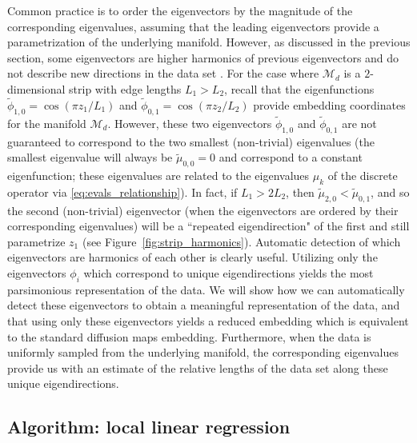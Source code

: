\documentclass[3p]{elsarticle}
\begin{document}
Common practice is to order the eigenvectors by the magnitude of the corresponding eigenvalues,
assuming that the leading eigenvectors provide a parametrization of the underlying manifold.
%
However, as discussed in the previous section, some eigenvectors are higher harmonics of
previous eigenvectors and do not describe new directions in the data set \cite{gerber2007robust}.
%
For the case where $\mathcal{M}_d$ is a $2$-dimensional strip with edge lengths $L_1  > L_2$, recall
that the eigenfunctions $\tilde{\phi}_{1,0} = \cos \left(  {\pi z_1}/{L_1} \right)$ and
$\tilde{\phi}_{0,1} = \cos \left(  {\pi z_2}/{L_2} \right)$ provide embedding coordinates for the manifold $\mathcal{M}_d$.
%
However, these two eigenvectors $\tilde{\phi}_{1, 0}$ and $\tilde{\phi}_{0, 1}$ are not guaranteed to
correspond to the two smallest (non-trivial) eigenvalues (the smallest eigenvalue will always be $\tilde{\mu}_{0,0} = 0$ and
correspond to a constant eigenfunction; these eigenvalues are related to the eigenvalues $\mu_k$ of the discrete
operator via \eqref{eq:evals_relationship}).
%
In fact, if $L_1 > 2 L_2$, then $\tilde{\mu}_{2, 0} < \tilde{\mu}_{0, 1}$, and so the
second (non-trivial) eigenvector (when the eigenvectors are ordered by their corresponding eigenvalues)
will be a ``repeated eigendirection" of the first and still parametrize $z_1$ (see Figure~\ref{fig:strip_harmonics}).
%
Automatic detection of which eigenvectors are harmonics of each other is clearly useful.
%
Utilizing only the eigenvectors $\phi_i$ which correspond to unique eigendirections yields
the most parsimonious representation of the data.
%
We will show how we can automatically detect these eigenvectors to obtain a meaningful representation of the data,
and that using only these eigenvectors yields a reduced embedding which is equivalent to the standard diffusion maps embedding.
%
Furthermore, when the data is uniformly sampled from the underlying manifold, the corresponding eigenvalues provide us with an estimate of the relative lengths of the data set along these unique eigendirections.


\subsection{Algorithm: local linear regression}
\end{document}
